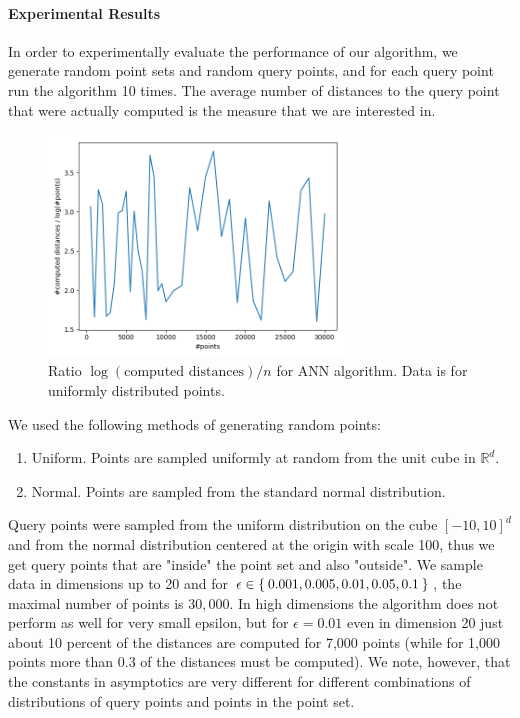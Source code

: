 \documentclass[a4paper,USenglish]{socg-lipics-v2018}
\newcommand{\R}{\mathbb{R}}
\newcommand{\eps}{\epsilon}
\begin{document}
\paragraph{Experimental Results}

In order to experimentally evaluate the performance of our algorithm,
we generate random point sets and random query points, and for each query point
run the algorithm 10 times. The average number of distances to the query point
that were actually computed is the measure that we are interested in.

\begin{figure}[ht]
    \label{fig:ann_const_ratio}
    \includegraphics[width=0.7\textwidth]{log_dependency_constant_ratio.png}
    \caption{Ratio $\log(\mbox{computed distances}) / n$ for ANN algorithm. Data is for uniformly distributed
    points.}
\end{figure}


We used the following methods of generating random points:
\begin{enumerate}
    \item Uniform. Points are sampled uniformly at random from the unit cube in $\R^d$.
    \item Normal. Points are sampled from the standard normal distribution.
\end{enumerate}
Query points were sampled from the uniform distribution on the cube $[-10, 10]^d$
and from the normal distribution centered at the origin with scale 100,
thus we get query points that are "inside" the point set and also "outside".
We sample data in dimensions up to 20 and for $\eps \in \Set{0.001, 0.005, 0.01, 0.05, 0.1}$,
the maximal number of points is $30,000$.
In high dimensions the algorithm does not perform as well for very small epsilon,
but for $\eps = 0.01$ even in dimension 20 just about 10 percent of the distances
are computed for 7,000 points (while for 1,000 points more than 0.3 of the distances must be computed).
We note, however, that the constants in asymptotics are very different for different combinations
of distributions of query points and points in the point set.
\end{document}
